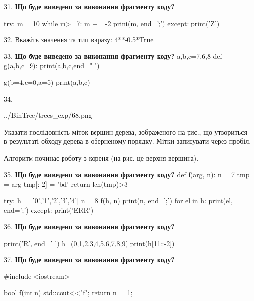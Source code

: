 \documentclass[11pt]{article}
\begin{document}
\par\vspace{5mm}
31. \textbf{Що буде виведено за виконання фрагменту коду?}

try:
    m = 10
    while m>=7:
        m += -2
    print(m, end=';')
except:
    print('Z')

\par\vspace{5mm}
32. 
Вкажіть значення та тип виразу:
4**-0.5*True
\par\vspace{5mm}
33. \textbf{Що буде виведено за виконання фрагменту коду?}
a,b,c=7,6,8
def g(a,b,c=9):
    print(a,b,c,end=" ")

g(b=4,c=0,a=5)
print(a,b,c)
\par\vspace{5mm}
34. 

\begin{center}
	{../BinTree/trees_exp/68.png}
\end{center}
Указати послідовність міток вершин дерева, зображеного на рис., що утвориться в результаті обходу дерева в оберненому порядку. Мітки записувати через пробіл.\par Алгоритм починає роботу з кореня (на рис. це верхня вершина).
\par\vspace{5mm}
35. \textbf{Що буде виведено за виконання фрагменту коду?}
def f(arg, n):
    n = 7
    tmp = arg
    tmp[:-2] = 'bd'
    return len(tmp)>3

try:
    h = ['0','1','2','3','4']
    n = 8
    f(h, n)
    print(n, end=';')
    for el in h:
        print(el, end=';')
except:
    print('ERR')
\par\vspace{5mm}
36. \textbf{Що буде виведено за виконання фрагменту коду?}

print('R', end=' ')
h=(0,1,2,3,4,5,6,7,8,9)
print(h[11::-2])

\par\vspace{5mm}
37. \textbf{Що буде виведено за виконання фрагменту коду?}

#include <iostream>

bool f(int n){
    std::cout<<"f";
    return n==1;
}
\end{document}
